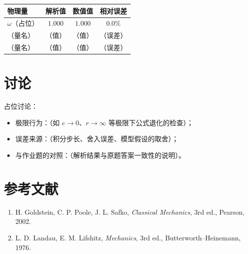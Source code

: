 \documentclass[UTF8,a4paper,11pt]{ctexart}
\begin{document}
\begin{center}
\begin{tabular}{lccc}
\toprule
物理量 & 解析值 & 数值值 & 相对误差 \\
\midrule
$\omega$（占位） & $1.000$ & $1.000$ & $0.0\%$ \\
（量名） & （值） & （值） & （误差） \\
（量名） & （值） & （值） & （误差） \\
\bottomrule
\end{tabular}
\end{center}

\section{讨论}
占位讨论：
\begin{itemize}
  \item 极限行为：（如 $e\to0$、$r\to\infty$ 等极限下公式退化的检查）；
  \item 误差来源：（积分步长、舍入误差、模型假设的取舍）；
  \item 与作业题的对照：（解析结果与原题答案一致性的说明）。
\end{itemize}

\section*{参考文献}
\begin{enumerate}
  \item H. Goldstein, C. P. Poole, J. L. Safko,
        \emph{Classical Mechanics}, 3rd ed., Pearson, 2002.
  \item L. D. Landau, E. M. Lifshitz,
        \emph{Mechanics}, 3rd ed., Butterworth--Heinemann, 1976.
\end{enumerate}
\end{document}

